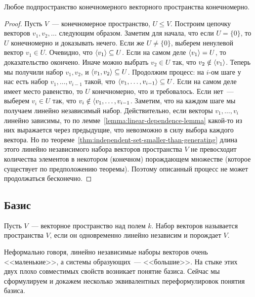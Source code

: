 \begin{proposition}\label{prop:subspace-of-fin-dim-is-fin-dim}
Любое подпространство конечномерного векторного пространства конечномерно.
\end{proposition}
\begin{proof}
Пусть $V$~--- конечномерное пространство, $U\leq V$. Построим цепочку
векторов $v_1,v_2,\dots$ следующим образом.
Заметим для начала, что если $U = \{0\}$, то $U$ конечномерно и доказывать
нечего. Если же $U\neq \{0\}$, выберем ненулевой вектор $v_1\in U$.
Очевидно, что $\langle v_1\rangle\subseteq U$.
Если на самом деле $\langle v_1\rangle = U$, то доказательство окончено. Иначе
можно выбрать $v_2\in U$ так, что $v_2\notin\langle v_1\rangle$.
Теперь мы получили набор $v_1,v_2$, и $\langle v_1,v_2\rangle\subseteq U$.
Продолжим процесс: на $i$-ом шаге у нас есть набор $v_1,\dots,v_{i-1}$ такой,
что $\langle v_1,\dots,v_{i-1}\rangle\subseteq U$. Если на самом деле имеет место равенство,
то $U$ конечномерно, что и требовалось. Если нет~--- выберем
$v_i\in U$ так, что $v_i\notin\langle v_1,\dots,v_{i-1}$. Заметим, что
на каждом шаге мы получаем линейно независимый набор. Действительно,
если векторы $v_1,\dots,v_i$ линейно зависимы, то по лемме~\ref{lemma:linear-dependence-lemma}
какой-то из них выражается через предыдущие, что невозможно в силу выбора
каждого вектора.
Но по теореме~\ref{thm:independent-set-smaller-than-generating} длина
этого линейно независимого набора векторов пространства $V$ не превосходит
количества элементов в некотором (конечном) порождающем множестве (которое
существует по предположению теоремы). Поэтому описанный процесс не может
продолжаться бесконечно.
\end{proof}

\subsection{Базис}

\begin{definition}
Пусть $V$~--- векторное пространство над полем $k$.
Набор векторов называется  пространства $V$,
если он одновременно линейно независим и порождает $V$.
\end{definition}

Неформально говоря, линейно независимые наборы векторов очень
<<маленькие>>, а системы образующих~--- <<большие>>. На стыке этих
двух плохо совместимых свойств возникает понятие базиса. Сейчас мы
сформулируем и докажем несколько эквивалентных переформулировок
понятия базиса.

